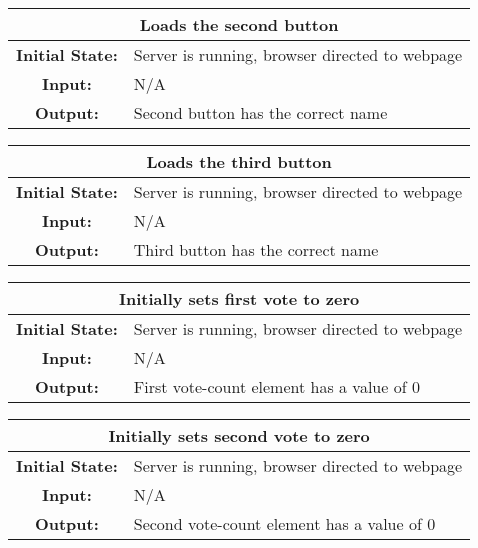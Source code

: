 \documentclass[12pt, titlepage]{article}
\begin{document}
\begin{center}
\begin{table}[H]
\begin{tabularx}{\textwidth}{| c X |}
\hline
\multicolumn{2}{|c|}{\textbf{Loads the second button}}\\
\hline
\textbf{Initial State: } & Server is running, browser directed to webpage\\
\textbf{Input: } & N/A\\
\textbf{Output: } & Second button has the correct name\\
\hline
\end{tabularx}
\end{table}
\end{center}


\begin{center}
\begin{table}[H]
\begin{tabularx}{\textwidth}{| c X |}
\hline
\multicolumn{2}{|c|}{\textbf{Loads the third button}}\\
\hline
\textbf{Initial State: } & Server is running, browser directed to webpage\\
\textbf{Input: } & N/A\\
\textbf{Output: } & Third button has the correct name\\
\hline
\end{tabularx}
\end{table}
\end{center}


\begin{center}
\begin{table}[H]
\begin{tabularx}{\textwidth}{| c X |}
\hline
\multicolumn{2}{|c|}{\textbf{Initially sets first vote to zero}}\\
\hline
\textbf{Initial State: } & Server is running, browser directed to webpage\\
\textbf{Input: } & N/A\\
\textbf{Output: } & First vote-count element has a value of 0\\
\hline
\end{tabularx}
\end{table}
\end{center}


\begin{center}
\begin{table}[H]
\begin{tabularx}{\textwidth}{| c X |}
\hline
\multicolumn{2}{|c|}{\textbf{Initially sets second vote to zero}}\\
\hline
\textbf{Initial State: } & Server is running, browser directed to webpage\\
\textbf{Input: } & N/A\\
\textbf{Output: } & Second vote-count element has a value of 0\\
\hline
\end{tabularx}
\end{table}
\end{center}
\end{document}
